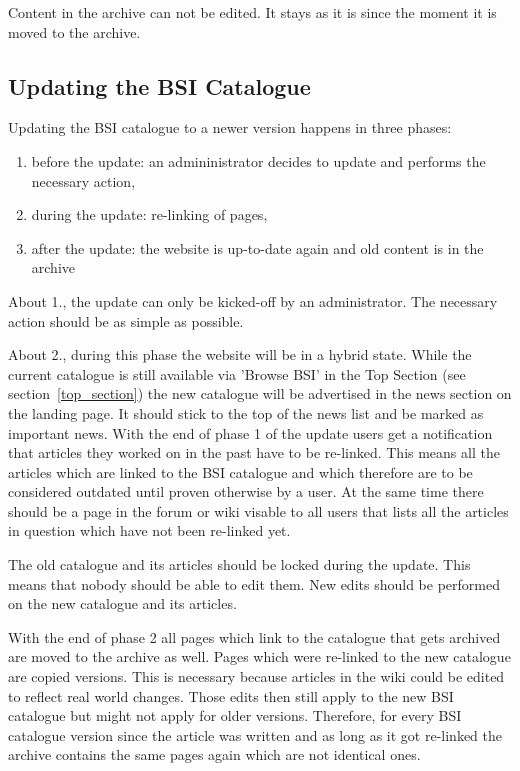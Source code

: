 \begin{tcolorbox}[breakable,colback=red!14,colframe=red!40!black,title=UPDATE 19/11/2017]
Content in the archive can not be edited.
It stays as it is since the moment it is moved to the archive.
\end{tcolorbox}


\subsection{Updating the BSI Catalogue}
\begin{tcolorbox}[breakable,colback=red!14,colframe=red!40!black,title=UPDATE 19/11/2017]
Updating the BSI catalogue to a newer version happens in three phases:
\begin{enumerate}
    \item before the update: an admininistrator decides to update and performs the necessary action,
    \item during the update: re-linking of pages,
    \item after the update: the website is up-to-date again and old content is in the archive 
\end{enumerate}

About 1., the update can only be kicked-off by an administrator.
The necessary action should be as simple as possible. 

\bigskip

About 2., during this phase the website will be in a hybrid state.
While the current catalogue is still available via 'Browse BSI' in the Top Section (see section~\ref{top_section}) the new catalogue will be advertised in the news section on the landing page.
It should stick to the top of the news list and be marked as important news.
With the end of phase 1 of the update users get a notification that articles they worked on in the past have to be re-linked.
This means all the articles which are linked to the BSI catalogue and which therefore are to be considered outdated until proven otherwise by a user.
At the same time there should be a page in the forum or wiki visable to all users that lists all the articles in question which have not been re-linked yet.
\begin{tcolorbox}[breakable,colback=red!18,colframe=red!40!black,title=UPDATE 04/12/2017]
The old catalogue and its articles should be locked during the update. 
This means that nobody should be able to edit them.
New edits should be performed on the new catalogue and its articles.
\end{tcolorbox}
With the end of phase 2 all pages which link to the catalogue that gets archived are moved to the archive as well.
Pages which were re-linked to the new catalogue are copied versions.
This is necessary because articles in the wiki could be edited to reflect real world changes. 
Those edits then still apply to the new BSI catalogue but might not apply for older versions.
Therefore, for every BSI catalogue version since the article was written and as long as it got re-linked the archive contains the same pages again which are not identical ones.
\medskip


\end{tcolorbox}
